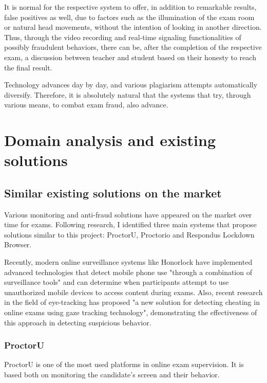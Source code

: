 \documentclass[12pt,a4paper]{article}
\begin{document}
It is normal for the respective system to offer, in addition to
remarkable results, false positives as well, due to factors such as
the illumination of the exam room or natural head movements, without
the intention of looking in another direction. Thus, through the
video recording and real-time signaling functionalities of
possibly fraudulent behaviors, there can be, after the completion of
the respective exam, a discussion between teacher and student based on
their honesty to reach the final result.

Technology advances day by day, and various plagiarism attempts automatically diversify.
Therefore, it is absolutely natural that the systems that try, through
various means, to combat exam fraud, also advance.

\section{Domain analysis and existing solutions}

\subsection{Similar existing solutions on the market}

Various monitoring and anti-fraud solutions have appeared on the market over time for exams. Following research, I identified
three main systems that propose solutions similar to this project: ProctorU\cite{proctoru}, 
Proctorio\cite{proctorio} and Respondus Lockdown Browser\cite{respondus}.

Recently, modern online surveillance systems like Honorlock have implemented advanced technologies 
that detect mobile phone use "through a combination of surveillance tools" and can
determine when participants attempt to use unauthorized mobile devices to access 
content during exams\cite{honorlock2023detecting}. Also, recent research in the field of 
eye-tracking has proposed "a new solution for detecting cheating in online exams using 
gaze tracking technology"\cite{dilini2021cheating}, demonstrating the effectiveness of this approach
in detecting suspicious behavior.

\subsubsection{ProctorU}
ProctorU is one of the most used platforms in
online exam supervision. It is based both on monitoring
the candidate's screen and their behavior. 
\end{document}
